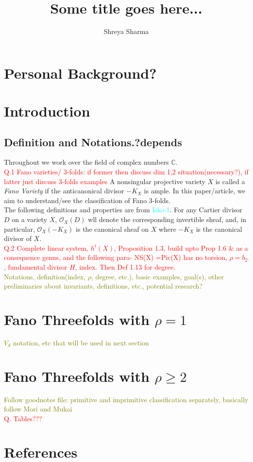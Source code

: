\documentclass[12pt]{amsart}
\begin{document}
	\title{\large{Some title goes here...}}
	\date{}
	\author{\small{Shreya Sharma}}
	\maketitle
	\tableofcontents
	
\section{Personal Background?}
\section{Introduction}
\subsection{Definition and Notations.?depends} Throughout we work over the field of complex numbers $\mathbb{C}$. \\
\textcolor{red}{Q.1 Fano varieties/ 3-folds: if former then discuss dim 1,2 situation(necessary?), if latter just discuss 3-folds examples}
A nonsingular projective variety $X$ is called a \textit{Fano Variety} if the anticanonical divisor $-K_X$ is ample. In this paper/article, we aim to understand/see the classification of Fano 3-folds. \\

	The following definitions and properties are from \textcolor{cyan}{Isko-1}. For any Cartier divisor $D$ on a variety $X$, $\mathcal{O}_X(D)$ wll denote the corresponding invertible sheaf, and, in particular, $\mathcal{O}_X(-K_X)$ is the canonical sheaf on $X$ where $-K_X$ is the canonical divisor of $X$. \\
	\textcolor{red}{ Q.2 Complete linear system, $h^i(X)$, Proposition 1.3, build upto Prop 1.6 \& as a consequence genus, and the following para- NS(X) =Pic(X) has no torsion, $\rho=b_2$, fundamental divisor $H$, index. Then Def 1.13 for degree.}\\
	  
	\textcolor{olive}{Notations, definition(index, $\rho$, degree, etc.), basic examples, goal(s), other preliminaries about invariants, definitions, etc., potential research?}
	\section{Fano Threefolds with $\rho =1$}
	\textcolor{olive}{ $V_d$ notation, etc that will be used in next section}
	\section{Fano Threefolds with $\rho \geq 2$}
	\textcolor{olive}{Follow goodnotes file: primitive and imprimitive classification separately, basically follow Mori and Mukai}\\ 
	\textcolor{red}{Q. Tables???}
	\section{References}
\end{document}
